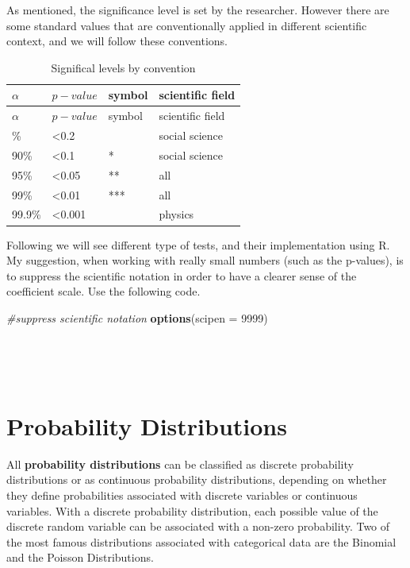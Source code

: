\documentclass[
]{svmono}
\newenvironment{Shaded}{\begin{snugshade}}{\end{snugshade}}
\newcommand{\AttributeTok}[1]{\textcolor[rgb]{0.13,0.29,0.53}{#1}}
\newcommand{\CommentTok}[1]{\textcolor[rgb]{0.56,0.35,0.01}{\textit{#1}}}
\newcommand{\DecValTok}[1]{\textcolor[rgb]{0.00,0.00,0.81}{#1}}
\newcommand{\FunctionTok}[1]{\textcolor[rgb]{0.13,0.29,0.53}{\textbf{#1}}}
\newcommand{\NormalTok}[1]{#1}
\begin{document}
As mentioned, the significance level is set by the researcher. However
there are some standard values that are conventionally applied in
different scientific context, and we will follow these conventions.

\begin{longtable}[]{@{}llll@{}}
\caption{Significal levels by convention}\tabularnewline
\toprule\noalign{}
\(\alpha\) & \(p-value\) & symbol & scientific field \\
\midrule\noalign{}
\endfirsthead
\toprule\noalign{}
\(\alpha\) & \(p-value\) & symbol & scientific field \\
\midrule\noalign{}
\endhead
\bottomrule\noalign{}
\endlastfoot
80\% & \textless0.2 & & social science \\
90\% & \textless0.1 & * & social science \\
95\% & \textless0.05 & ** & all \\
99\% & \textless0.01 & *** & all \\
99.9\% & \textless0.001 & & physics \\
\end{longtable}

Following we will see different type of tests, and their implementation
using R. My suggestion, when working with really small numbers (such as
the p-values), is to suppress the scientific notation in order to have a
clearer sense of the coefficient scale. Use the following code.

\begin{Shaded}
\begin{Highlighting}[]
\CommentTok{\#suppress scientific notation}
\FunctionTok{options}\NormalTok{(}\AttributeTok{scipen =} \DecValTok{9999}\NormalTok{)}
\end{Highlighting}
\end{Shaded}

~

~
~

\hypertarget{probability-distributions}{%
\section{Probability Distributions}\label{probability-distributions}}

All \textbf{probability distributions} can be classified as discrete
probability distributions or as continuous probability distributions,
depending on whether they define probabilities associated with discrete
variables or continuous variables. With a discrete probability
distribution, each possible value of the discrete random variable can be
associated with a non-zero probability. Two of the most famous
distributions associated with categorical data are the Binomial and the
Poisson Distributions.
\end{document}
